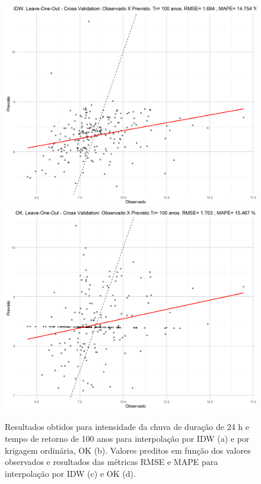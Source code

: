 \documentclass[
]{agujournal2019}
\begin{document}
\begin{figure}
\begin{minipage}{\linewidth}
{}


\end{minipage}%
\newline
\begin{minipage}{\linewidth}
\includegraphics{Figuras/Figura13c.png}
\includegraphics{Figuras/Figura13d.png}\end{minipage}%

\caption{\label{fig-Figura13}Resultados obtidos para intensidade da
chuva de duração de 24 h e tempo de retorno de 100 anos para
interpolação por IDW (a) e por krigagem ordinária, OK (b). Valores
preditos em função dos valores observados e resultados das métricas RMSE
e MAPE para interpolação por IDW (c) e OK (d).}

\end{figure}%
\end{document}
